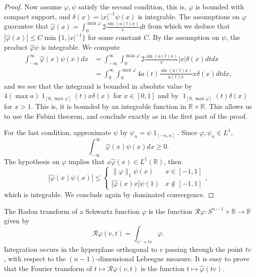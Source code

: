 \documentclass{amsart}
\def \R {\mathbb R}
\renewcommand {\chi}{\operatorname{1}}
\begin{document}
\begin{proof}
	Now assume $\varphi, \psi$ satisfy the second condition, this is, $\varphi$ is bounded with compact support, and $\delta(x) = |x|^{-1} \psi(x)$ is integrable.
	The assumptions on $\varphi$ guarantee that $\hat\varphi(x) = \int_0^{\max \varphi} 2 \frac {\sin(a(t) x)}x dt$ from which we deduce that $|\hat\varphi(x)| \leq C \min\{1, |x|^{-1}\}$ for some constant $C$. By the assumption on $\psi$, the product $\hat\varphi \psi$ is integrable. We compute
	\begin{align}
		\int_{-\infty}^\infty \hat\varphi(x) \psi(x) d x 
		&= \int_{-\infty}^\infty \int_0^{\max \varphi} 2 \frac {\sin(a(t) x)}x |x| \delta(x) d t d x\\
		&= \int_0^\infty \int_0^{\max \varphi} 4 a(t) \frac {\sin(a(t) x)}{a(t) x} x \delta(x) d t d x,
	\end{align}
	and we see that the integrand is bounded in absolute value by $4 (\max a) \chi_{[0,\max \varphi]}(t) x \delta(x)$ for $x \in [0,1]$ and by $\chi_{[0,\max \varphi]}(t) \delta(x)$ for $x > 1$. This is, it is bounded by an integrable function in $\R \times \R$.
	This allows us to use the Fubini theorem, and conclude exactly as in the first part of the proof.

	For the last condition, approximate $\psi$ by $\psi_n = \psi \chi_{[-n,n]}$. Since $\varphi,\psi_n \in L^1$,
	\[\int_{-\infty}^\infty \hat \varphi(x) \psi(x) dx \geq 0.\]
	The hypothesis on $\varphi$ implies that $x \hat \varphi(x) \in L^1(\R)$, then 
	\[|\hat \varphi(x) \psi(x)| \leq \begin{cases} \|\varphi\|_1 \psi(x) & x \in [-1,1] \\ |\hat \varphi(x) x| \psi(1) & x \not\in [-1,1] \end{cases},\]
which is integrable. We conclude again by dominated convergence.

\end{proof}

The Radon transform of a Schwartz function $\varphi$ is the function $\mathcal R \varphi: S^{n-1} \times \R \to \R$ given by
\[ \mathcal R \varphi(v,t) = \int_{v^\perp + t v} \varphi.\]
Integration occurs in the hyperplane orthogonal to $v$ passing through the point $t v$, with respect to the $(n-1)$-dimensional Lebesgue measure.
It is easy to prove that the Fourier transform of $t \mapsto \mathcal R \varphi(v,t)$ is the function $t \mapsto \hat\varphi(t v)$.
\end{document}
